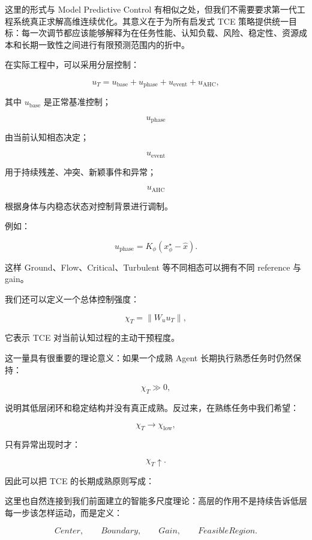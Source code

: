 这里的形式与 Model Predictive Control 有相似之处，但我们不需要要求第一代工程系统真正求解高维连续优化。其意义在于为所有启发式 TCE 策略提供统一目标：每一次调节都应该能够解释为在任务性能、认知负载、风险、稳定性、资源成本和长期一致性之间进行有限预测范围内的折中。

在实际工程中，可以采用分层控制：

\[
u_T
=
u_{\mathrm{base}}
+
u_{\mathrm{phase}}
+
u_{\mathrm{event}}
+
u_{\mathrm{AHC}},
\]

其中 $u_{\mathrm{base}}$ 是正常基准控制；

\[
u_{\mathrm{phase}}
\]

由当前认知相态决定；

\[
u_{\mathrm{event}}
\]

用于持续残差、冲突、新颖事件和异常；

\[
u_{\mathrm{AHC}}
\]

根据身体与内稳态状态对控制背景进行调制。

例如：

\[
u_{\mathrm{phase}}
=
K_{\phi}
\left(
x^\star_\phi-\hat x
\right).
\]

这样 Ground、Flow、Critical、Turbulent 等不同相态可以拥有不同 reference 与 gain。

我们还可以定义一个总体控制强度：

\[
\chi_T
=
\|W_u u_T\|,
\]

它表示 TCE 对当前认知过程的主动干预程度。

这一量具有很重要的理论意义：如果一个成熟 Agent 长期执行熟悉任务时仍然保持：

\[
\chi_T\gg0,
\]

说明其低层闭环和稳定结构并没有真正成熟。反过来，在熟练任务中我们希望：

\[
\chi_T\rightarrow
\chi_{\mathrm{low}},
\]

只有异常出现时才：

\[
\chi_T\uparrow.
\]

因此可以把 TCE 的长期成熟原则写成：

\begin{statementbox}
\centering
{}
\end{statementbox}

这里也自然连接到我们前面建立的智能多尺度理论：高层的作用不是持续告诉低层每一步该怎样运动，而是定义：

\[
Center,\qquad
Boundary,\qquad
Gain,\qquad
FeasibleRegion.
\]

